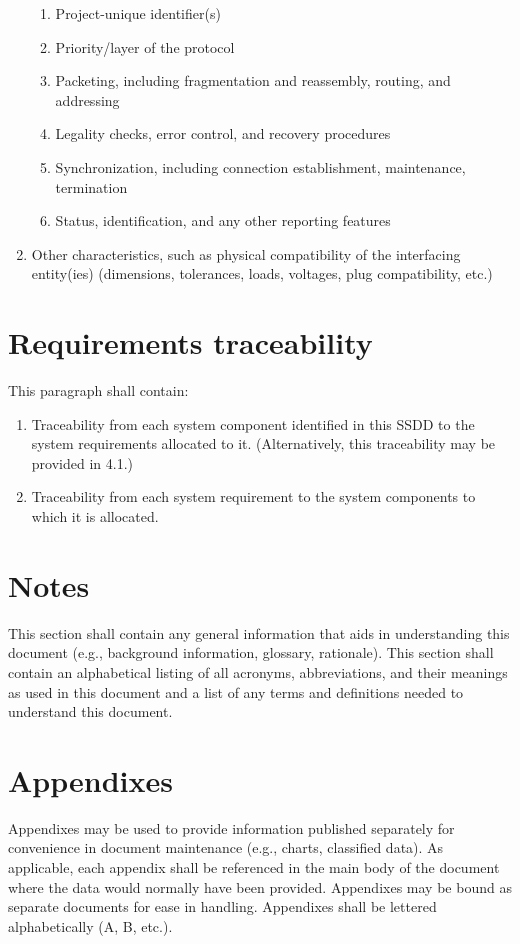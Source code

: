 \begin{enumerate}
  \begin{enumerate}
  \itemsep1pt\parskip0pt
  \item
    Project-unique identifier(s)
  \item
    Priority/layer of the protocol
  \item
    Packeting, including fragmentation and reassembly, routing, and
    addressing
  \item
    Legality checks, error control, and recovery procedures
  \item
    Synchronization, including connection establishment, maintenance,
    termination
  \item
    Status, identification, and any other reporting features
  \end{enumerate}
\item
  Other characteristics, such as physical compatibility of the
  interfacing entity(ies) (dimensions, tolerances, loads, voltages, plug
  compatibility, etc.)
\end{enumerate}

\section{Requirements traceability}

This paragraph shall contain:

\begin{enumerate}
\itemsep1pt\parskip0pt
\item
  Traceability from each system component identified in this SSDD to the
  system requirements allocated to it. (Alternatively, this traceability
  may be provided in 4.1.)
\item
  Traceability from each system requirement to the system components to
  which it is allocated.
\end{enumerate}

\section{Notes}

This section shall contain any general information that aids in
understanding this document (e.g., background information, glossary,
rationale). This section shall contain an alphabetical listing of all
acronyms, abbreviations, and their meanings as used in this document and
a list of any terms and definitions needed to understand this document.

\appendix

\section{Appendixes}

Appendixes may be used to provide information published separately for
convenience in document maintenance (e.g., charts, classified data). As
applicable, each appendix shall be referenced in the main body of the
document where the data would normally have been provided. Appendixes
may be bound as separate documents for ease in handling. Appendixes
shall be lettered alphabetically (A, B, etc.).
